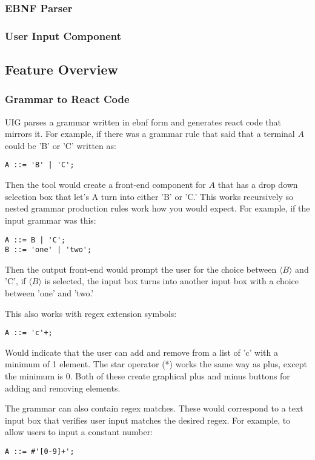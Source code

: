 \documentclass[hidelinks,12pt]{article}
\newcounter{subsubsubsection}[subsubsection]
\begin{document}
\begin{doublespacing}
\subsubsection{EBNF Parser}
\subsubsection{User Input Component}
\subsection{Feature Overview}
\subsubsection*{Grammar to React Code}
UIG parses a grammar written in ebnf form and generates react code that mirrors it. For example, if there was a grammar rule that said that a terminal $A$ could be 'B' or 'C' written as:

\begin{verbatim}
A ::= 'B' | 'C';
\end{verbatim}

Then the tool would create a front-end component for $A$ that has a drop down selection box that let's A turn into either 'B' or 'C.' This works recursively so nested grammar production rules work how you would expect. For example, if the input grammar was this:

\begin{verbatim}
A ::= B | 'C';
B ::= 'one' | 'two';
\end{verbatim}

Then the output front-end would prompt the user for the choice between $\langle B \rangle$ and 'C', if $\langle B \rangle$ is selected, the input box turns into another input box with a choice between 'one' and 'two.'

This also works with regex extension symbols:
\begin{verbatim}
A ::= 'c'+;
\end{verbatim}
Would indicate that the user can add and remove from a list of 'c' with a minimum of 1 element. The star operator (*) works the same way as plus, except the minimum is 0. Both of these create graphical plus and minus buttons for adding and removing elements.

The grammar can also contain regex matches. These would correspond to a text input box that verifies user input matches the desired regex. For example, to allow users to input a constant number:
\begin{verbatim}
A ::= #'[0-9]+';
\end{verbatim}


\end{doublespacing}
\end{document}
